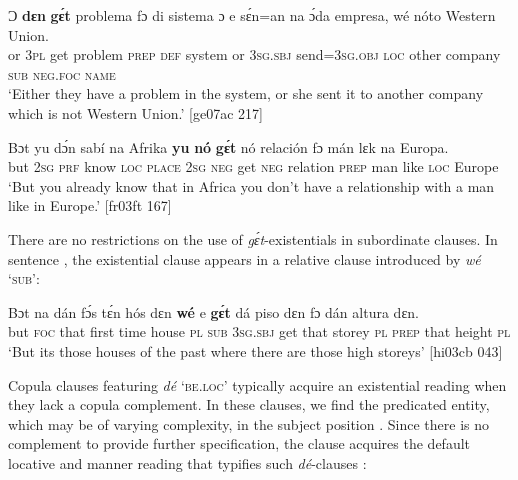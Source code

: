 \ea%
    \label{ex:key:805}
    \gll Ɔ  \textbf{dɛn}  \textbf{gɛ́t}  problema  fɔ  di  sistema  ɔ  e    sɛ́n=an
na  ɔ́da    empresa,    wé  nóto  Western  Union.\\
or  \textsc{3pl}  get  problem    \textsc{prep}  \textsc{def}  system  or  \textsc{3sg.sbj}  send=\textsc{3sg.obj}
\textsc{loc}  other  company    \textsc{sub}  \textsc{neg}.\textsc{foc}  \textsc{name}\\

\glt ‘Either they have a problem in the system, or she sent it to another company 
which is not Western Union.’ [ge07ac 217]
\z


\ea%
    \label{ex:key:806}
    \gll Bɔt  yu  dɔ́n  sabí    na  Afrika  \textbf{yu}  \textbf{nó}  \textbf{gɛ́t}  nó
relación  fɔ  mán    lɛk  na  Europa.\\
but  \textsc{2sg}  \textsc{prf}  know  \textsc{loc}  \textsc{place}  \textsc{2sg}  \textsc{neg}  get \textsc{neg}
relation  \textsc{prep}  man    like  \textsc{loc}  Europe\\

\glt ‘But you already know that in Africa you don’t have a 
relationship with a man like in Europe.’ [fr03ft 167]
\z

There are no restrictions on the use of \textit{gɛ́t}-existentials in subordinate clauses. In sentence , the existential clause appears in a relative clause introduced by \textit{wé} ‘\textsc{sub}’: 


\ea%
    \label{ex:key:807}
    \gll Bɔt  na  dán  fɔ́s  tɛ́n  hós    dɛn  \textbf{wé}  e    \textbf{gɛ́t}
dá  piso    dɛn  fɔ  dán  altura  dɛn.\\
but  \textsc{foc}  that  first  time  house  \textsc{pl}  \textsc{sub}  \textsc{3sg.sbj}  get
that  storey  \textsc{pl}  \textsc{prep}  that  height  \textsc{pl}\\

\glt ‘But its those houses of the past where there are those high storeys’ [hi03cb 043]
\z

Copula clauses featuring \textit{dé} \textsc{‘be.loc’} typically acquire an existential reading when they lack a copula complement. In these clauses, we find the predicated entity, which may be of varying complexity, in the subject position . Since there is no complement to provide further specification, the clause acquires the default locative and manner reading that typifies such \textit{dé}{}-clauses :


